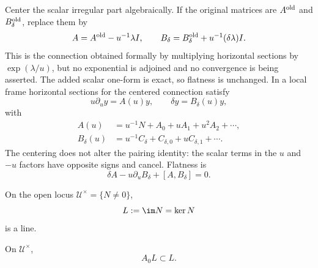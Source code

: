 Center the scalar irregular part algebraically.  If the original matrices
are $A^{\rm old}$ and $B^{\rm old}_\delta$, replace them by
\[
  A=A^{\rm old}-u^{-1}\lambda I,
  \qquad
  B_\delta=B^{\rm old}_\delta+u^{-1}(\delta\lambda)I.
\]
This is the connection obtained formally by multiplying horizontal sections by
$\exp(\lambda/u)$, but no exponential is adjoined and no convergence is
being asserted.  The added scalar one-form is exact, so flatness is
unchanged.  In a local frame horizontal sections for the centered connection
satisfy
\begin{equation}\label{eq:localpair}
  u\partial_u y=A(u)y,\qquad
  \delta y=B_\delta(u)y,
\end{equation}
with
\begin{align}
  A(u)&=u^{-1}N+A_0+uA_1+u^2A_2+\cdots,\label{eq:Aexp}\\
  B_\delta(u)&=u^{-1}C_\delta+C_{\delta,0}
       +uC_{\delta,1}+\cdots.\label{eq:Bexp}
\end{align}
The centering does not alter the pairing identity: the scalar terms in the
$u$ and $-u$ factors have opposite signs and cancel.  Flatness is
\begin{equation}\label{eq:flatAB}
  \delta A-u\partial_uB_\delta+[A,B_\delta]=0.
\end{equation}

On the open locus $\mathcal U^\times=\{N\ne0\}$,
\[
  L:=\im N=\ker N
\]
is a line.

\begin{lemma}
\label{lem:A0preserve}
%
%
On $\mathcal U^\times$,
\begin{equation}\label{eq:A0L}
  A_0L\subset L.
\end{equation}
\end{lemma}

